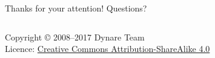 \documentclass{beamer}
\begin{document}

\begin{frame}
  \begin{center}
    \vfill {\LARGE Thanks for your attention!} \vfill
    {\LARGE Questions?}
    \vfill
  \end{center}
  \vfill
  \begin{columns}[T]

    \ccbysa
    \tiny
    Copyright © 2008--2017 Dynare Team \\
    Licence: \href{http://creativecommons.org/licenses/by-sa/4.0/}{Creative
      Commons Attribution-ShareAlike 4.0}
    \end{columns}
  \end{frame}
\end{document}
